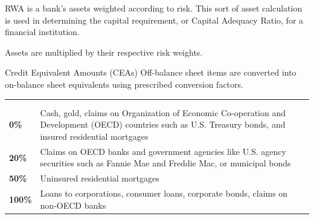 
\begin{lettered}
\item RWA is a bank's assets weighted according to risk. This sort of asset
calculation is used in determining the capital requirement, or Capital Adequacy
Ratio, for a financial institution.
\item Assets are multiplied by their respective risk weights.
\end{lettered}

\begin{ordefbox}{Credit Equivalent Amounts (CEAs)}
Off-balance sheet items are converted into on-balance sheet equivalents using
prescribed conversion factors.
\end{ordefbox}

\noindent\begin{minipage}{\textwidth}
\renewcommand{\arraystretch}{1.32}
\begin{tabularx}{\textwidth}{@{}L{0.17\textwidth}Y@{}}
\\
  & \\
{\tabfont \textbf{0\%}} & {\tabfont Cash, gold, claims on Organization of Economic Co-operation and Development (OECD) countries such as U.S. Treasury bonds, and insured residential mortgages}\\
{\tabfont \textbf{20\%}} & {\tabfont Claims on OECD banks and government agencies like U.S. agency securities such as Fannie Mae and Freddie Mac, or municipal bonds}\\
{\tabfont \textbf{50\%}} & {\tabfont Uninsured residential mortgages}\\
{\tabfont \textbf{100\%}} & {\tabfont Loans to corporations, consumer loans, corporate bonds, claims on non-OECD banks}\\
\end{tabularx}
\end{minipage}


